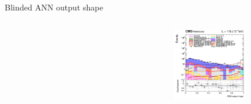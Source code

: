 \documentclass[8pt]{beamer}
\begin{document}
\begin{frame}{Blinded ANN output shape}
\begin{columns}
\begin{column}{0.33\textwidth}
\begin{center}
    		\end{center}		
		\end{column}
		\begin{column}{0.33\textwidth}
			\begin{center}
     			\includegraphics[width=1.0\textwidth, height=90pt]{figs/2018/log_cratio_topCR_ll_var_DNN_signal0_pseudo500.png}
    		\end{center}		
		\end{column}
\end{columns} \vfill
\end{frame}
\end{document}
